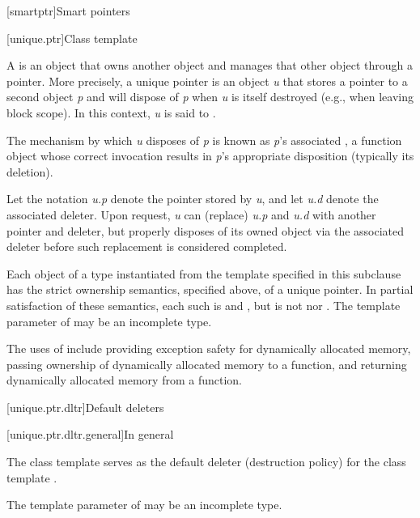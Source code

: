 
[smartptr]{Smart pointers}

[unique.ptr]{Class template }

\pnum
A  is an object that owns another object and
manages that other object through a pointer. More precisely, a unique pointer
is an object \textit{u} that stores a pointer to a second object \textit{p} and
will dispose of \textit{p} when \textit{u} is itself destroyed (e.g., when
leaving block scope). In this context, \textit{u} is said
to  .

\pnum
The mechanism by which \textit{u} disposes of \textit{p} is known as
\textit{p}'s associated , a function object whose correct
invocation results in \textit{p}'s appropriate disposition (typically its deletion).

\pnum
Let the notation \textit{u.p} denote the pointer stored by \textit{u}, and
let \textit{u.d} denote the associated deleter. Upon request, \textit{u} can
 (replace) \textit{u.p} and \textit{u.d} with another pointer and
deleter, but properly disposes of its owned object via the associated
deleter before such replacement is considered completed.

\pnum
Each object of a type  instantiated from the  template
specified in this subclause has the strict ownership semantics, specified above,
of a unique pointer. In partial satisfaction of these semantics, each such 
is  and , but is not
 nor .
The template parameter  of  may be an incomplete type.

\pnum
\begin{note} The uses
of  include providing exception safety for
dynamically allocated memory, passing ownership of dynamically allocated
memory to a function, and returning dynamically allocated memory from a
function. \end{note}

[unique.ptr.dltr]{Default deleters}

[unique.ptr.dltr.general]{In general}

\pnum
The class template  serves as the default deleter (destruction policy)
for the class template .

\pnum
The template parameter  of  may be
an incomplete type.

